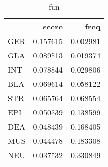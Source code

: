\begin{table}[H]
\begin{center}
\begin{tabular}{lrr}
\toprule
 & score & freq \\
\midrule
GER & {\cellcolor[HTML]{84CB7E}} \color[HTML]{000000} 0.157615 & {\cellcolor[HTML]{FFFFE5}} \color[HTML]{000000} 0.002981 \\
GLA & {\cellcolor[HTML]{D5EEA1}} \color[HTML]{000000} 0.089513 & {\cellcolor[HTML]{FCFED4}} \color[HTML]{000000} 0.019374 \\
INT & {\cellcolor[HTML]{DDF2A6}} \color[HTML]{000000} 0.078844 & {\cellcolor[HTML]{FAFDC9}} \color[HTML]{000000} 0.029806 \\
BLA & {\cellcolor[HTML]{E4F4AB}} \color[HTML]{000000} 0.069614 & {\cellcolor[HTML]{EDF8B1}} \color[HTML]{000000} 0.058122 \\
STR & {\cellcolor[HTML]{E7F6AD}} \color[HTML]{000000} 0.065764 & {\cellcolor[HTML]{E5F5AC}} \color[HTML]{000000} 0.068554 \\
EPI & {\cellcolor[HTML]{F3FAB6}} \color[HTML]{000000} 0.050339 & {\cellcolor[HTML]{9DD688}} \color[HTML]{000000} 0.138599 \\
DEA & {\cellcolor[HTML]{F4FBB7}} \color[HTML]{000000} 0.048439 & {\cellcolor[HTML]{75C578}} \color[HTML]{000000} 0.168405 \\
MUS & {\cellcolor[HTML]{F7FCB9}} \color[HTML]{000000} 0.044478 & {\cellcolor[HTML]{62BB6E}} \color[HTML]{F1F1F1} 0.183308 \\
NEU & {\cellcolor[HTML]{F8FDC1}} \color[HTML]{000000} 0.037532 & {\cellcolor[HTML]{004529}} \color[HTML]{F1F1F1} 0.330849 \\
\bottomrule
\end{tabular}
\caption{fun}\end{center}\end{table}
